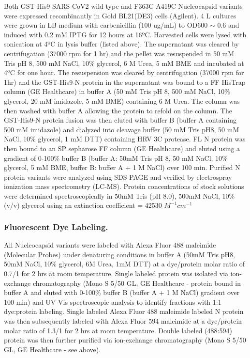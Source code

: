 \documentclass[../main.tex]{subfiles}
\begin{document}
        Both GST-His9-SARS-CoV2 wild-type and F363C A419C Nucleocapsid variants were expressed recombinantly in Gold BL21(DE3) cells (Agilent). 4 L cultures were grown in LB medium with carbenicillin (100 ug/mL) to OD600 $\sim$ 0.6 and induced with 0.2 mM IPTG for 12 hours at 16ºC. Harvested cells were lysed with sonication at 4ºC in lysis buffer (listed above). The supernatant was cleared by centrifugation (37000 rpm for 1 hr) and the pellet was resuspended in 50 mM Tris pH 8, 500 mM NaCl, 10\% glycerol, 6 M Urea, 5 mM BME and incubated at 4ºC for one hour. The resuspension was cleared by centrifugation (37000 rpm for 1hr) and the GST-His9-N protein in the supernatant was bound to a FF HisTrap column (GE Healthcare) in buffer A (50 mM Tris pH 8, 500 mM NaCl, 10\% glycerol, 20 mM imidazole, 5 mM BME) containing 6 M Urea. The column was then washed with buffer A allowing the protein to refold on the column. The GST-His9-N protein fusion was then eluted with buffer B (buffer A containing 500 mM imidazole) and dialyzed into cleavage buffer (50 mM Tris pH8, 50 mM NaCl, 10\% glycerol, 1 mM DTT) containing HRV 3C protease. FL N protein was then bound to an SP sepharose FF column (GE Healthcare) and eluted using a gradient of 0-100\% buffer B (buffer A: 50mM Tris pH 8, 50 mM NaCl, 10\% glycerol, 5 mM BME, buffer B: buffer A + 1 M NaCl) over 100 min. Purified N protein variants were analyzed using SDS-PAGE and verified by electrospray ionization mass spectrometry (LC-MS). Protein concentrations of stock solutions were determined spectroscopically in 50mM Tris (pH 8.0), 500mM NaCl, 10\% (v/v) glycerol using an extinction coefficient = 42530 $M^{-1}cm^{-1}$

    \subsubsection{Fluorescent Dye Labeling.}
        All Nucleocapsid variants were labeled with Alexa Fluor 488 maleimide (Molecular Probes) under denaturing conditions in buffer A (50mM Tris pH8, 50mM NaCl, 10\% glycerol, 6M Urea, 1mM DTT) at a dye/protein molar ratio of 0.7/1 for 2 hrs at room temperature. Single labeled protein was isolated via ion-exchange chromatography (Mono S 5/50 GL, GE Healthcare - protein bound in buffer A and eluted with 0-100\% buffer B (buffer A + 1 M NaCl) gradient over 100 min) and UV-Vis spectroscopic analysis to identify fractions with 1:1 dye:protein labeling. Single labeled Alexa Fluor 488 maleimide labeled N protein was then subsequently labeled with Alexa Fluor 594 maleimide at a dye/protein molar ratio of 1.3/1 for 2 hrs at room temperature. Double labeled (488:594) protein was then further purified via ion-exchange chromatography (Mono S 5/50 GL, GE Healthcare - see above). 
\end{document}

